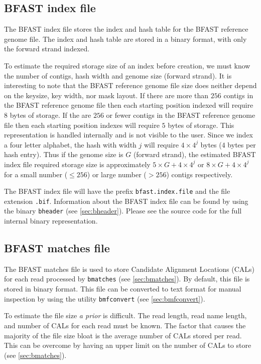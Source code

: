 \documentclass[a4paper,12pt]{book}
\newcommand{\TT}[1]{{\tt #1}} %
\newcommand{\IF}[1]{{\it #1}} %
\newcommand{\BRGF}{BFAST reference genome file} %
\newcommand{\BIF}{BFAST index file} %
\newcommand{\BMF}{BFAST matches file} %
\begin{document}
\subsection{\BIF{}}
\label{sec:bif}
The \BIF{} stores the index and hash table for the \BRGF{}.
The index and hash table are stored in a binary format, with only the forward strand indexed.

To estimate the required storage size of an index before creation, we must know the number of contigs, hash width and genome size (forward strand).
It is interesting to note that the \BRGF{} size does neither depend on the keysize, key width, nor mask layout. 
If there are more than $256$ contigs in the \BRGF{} then each starting position indexed will require $8$ bytes of storage.
If the are $256$ or fewer contigs in the \BRGF{} then each starting position indexes will require $5$ bytes of storage.
This representation is handled internally and is not visible to the user.
Since we index a four letter alphabet, the hash with width $j$ will require $4\times4^j$ bytes ($4$ bytes per hash entry).
Thus if the genome size is $G$ (forward strand), the estimated \BIF{} required storage size is approximately $5\times G + 4\times 4^j$ or $8\times G + 4\times 4^j$ for a small number ($\leq 256$) or large number ($>256$) contigs respectively. 

The \BIF{} will have the prefix \TT{bfast.index.file} and the file extension \TT{.bif}.
Information about the \BIF{} can be found by using the binary \TT{bheader} (see \autoref{sec:bheader}).
Please see the source code for the full internal binary representation.

\subsection{\BMF{}}
\label{sec:bmf}
The \BMF{} is used to store Candidate Alignment Locations (CALs) for each read processed by \TT{bmatches} (see \autoref{sec:bmatches}).
By default, this file is stored in binary format.
This file can be converted to text format for manual inspection by using the utility \TT{bmfconvert} (see \autoref{sec:bmfconvert}).

To estimate the file size \IF{a prior} is difficult.
The read length, read name length, and number of CALs for each read must be known.
The factor that causes the majority of the file size bloat is the average number of CALs stored per read.
This can be overcome by having an upper limit on the number of CALs to store (see \autoref{sec:bmatches}).
\end{document}
